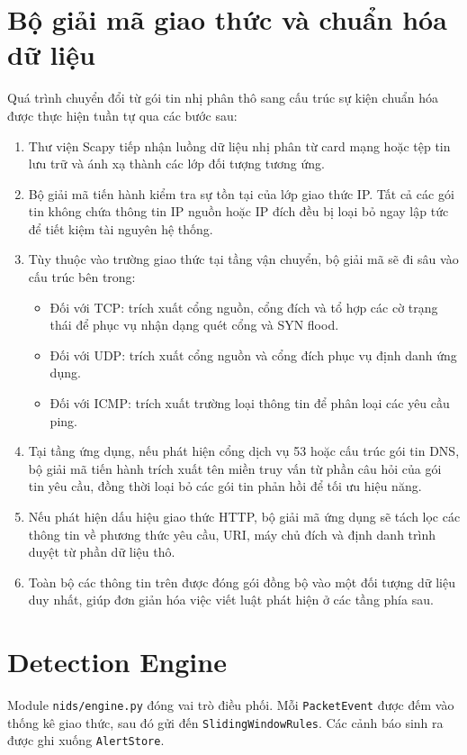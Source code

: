 \section{Bộ giải mã giao thức và chuẩn hóa dữ liệu}
Quá trình chuyển đổi từ gói tin nhị phân thô sang cấu trúc sự kiện chuẩn hóa được thực hiện tuần tự qua các bước sau:
\begin{enumerate}
    \item Thư viện Scapy tiếp nhận luồng dữ liệu nhị phân từ card mạng hoặc tệp tin lưu trữ và ánh xạ thành các lớp đối tượng tương ứng.
    \item Bộ giải mã tiến hành kiểm tra sự tồn tại của lớp giao thức IP. Tất cả các gói tin không chứa thông tin IP nguồn hoặc IP đích đều bị loại bỏ ngay lập tức để tiết kiệm tài nguyên hệ thống.
    \item Tùy thuộc vào trường giao thức tại tầng vận chuyển, bộ giải mã sẽ đi sâu vào cấu trúc bên trong:
    \begin{itemize}
        \item Đối với TCP: trích xuất cổng nguồn, cổng đích và tổ hợp các cờ trạng thái để phục vụ nhận dạng quét cổng và SYN flood.
        \item Đối với UDP: trích xuất cổng nguồn và cổng đích phục vụ định danh ứng dụng.
        \item Đối với ICMP: trích xuất trường loại thông tin để phân loại các yêu cầu ping.
    \end{itemize}
    \item Tại tầng ứng dụng, nếu phát hiện cổng dịch vụ 53 hoặc cấu trúc gói tin DNS, bộ giải mã tiến hành trích xuất tên miền truy vấn từ phần câu hỏi của gói tin yêu cầu, đồng thời loại bỏ các gói tin phản hồi để tối ưu hiệu năng.
    \item Nếu phát hiện dấu hiệu giao thức HTTP, bộ giải mã ứng dụng sẽ tách lọc các thông tin về phương thức yêu cầu, URI, máy chủ đích và định danh trình duyệt từ phần dữ liệu thô.
    \item Toàn bộ các thông tin trên được đóng gói đồng bộ vào một đối tượng dữ liệu duy nhất, giúp đơn giản hóa việc viết luật phát hiện ở các tầng phía sau.
\end{enumerate}

\section{Detection Engine}
Module \texttt{nids/engine.py} đóng vai trò điều phối. Mỗi \texttt{PacketEvent} được đếm vào thống kê giao thức, sau đó gửi đến \texttt{SlidingWindowRules}. Các cảnh báo sinh ra được ghi xuống \texttt{AlertStore}.

